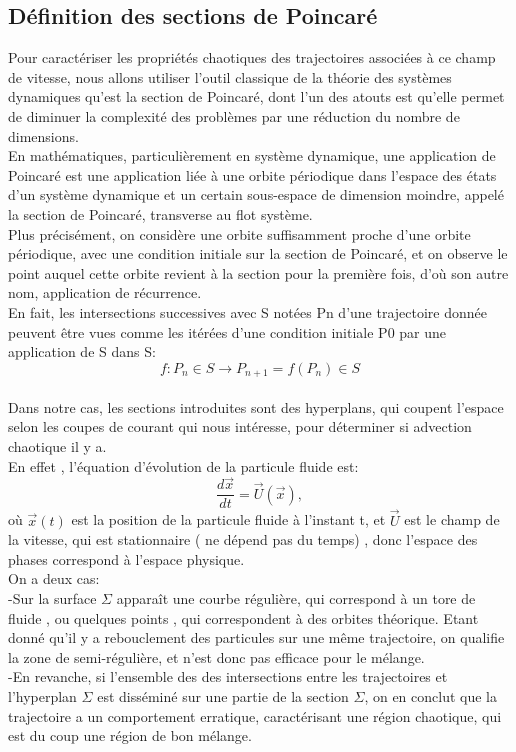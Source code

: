 \documentclass[a4paper,12pt,titlepage]{report}
\begin{document}
\subsection{Définition des sections de Poincaré}
Pour caractériser les propriétés chaotiques des trajectoires associées à ce champ de vitesse, nous allons utiliser l'outil classique de la théorie des systèmes dynamiques qu'est la section de Poincaré, dont l'un des atouts est qu'elle permet de diminuer la complexité des problèmes par une réduction du nombre de dimensions. 
\\
En mathématiques, particulièrement en système dynamique, une application de Poincaré est une application liée à une orbite périodique dans l’espace des états d’un système dynamique et un certain sous-espace de dimension moindre, appelé la section de Poincaré, transverse au  flot système.\\
 Plus précisément, on considère une orbite suffisamment proche d'une orbite périodique, avec une condition initiale sur la section de Poincaré, et on observe le point auquel cette orbite revient à la section pour la première fois, d'où son autre nom, application de récurrence.
\\
En fait, les intersections successives avec S notées Pn d’une trajectoire donnée peuvent être vues comme les itérées d’une condition initiale P0 par une application de S dans S:
\\
\[f: P_n \in S \to P_{n+1} = f(P_n) \in S \]
\\
Dans notre cas, les sections introduites sont des hyperplans, qui coupent l'espace selon les coupes de courant qui nous intéresse, pour déterminer si advection chaotique il y a.
\\
En effet , l'équation d'évolution de la particule fluide est:
\\
\[ \frac{d\vec{x}}{dt} = \vec{U}(\vec{x}), \]
où $\vec{x}(t)$ est la position de la particule fluide à l'instant t, et $\vec{U}$ est le champ de la vitesse, qui est stationnaire ( ne dépend pas du temps) , donc l'espace des phases correspond à l'espace physique. 
\\
On a deux cas:
\\
-Sur la surface $\Sigma $ apparaît une courbe régulière, qui correspond à un tore de fluide , ou quelques points , qui correspondent à des orbites théorique. Etant donné qu'il y a rebouclement des particules sur une même trajectoire, on qualifie la zone de semi-régulière, et n'est donc pas efficace pour le mélange. 
\\

-En revanche, si l'ensemble des des intersections entre les trajectoires et l'hyperplan $\Sigma$ est disséminé sur une partie de la section $\Sigma$, on en conclut que la trajectoire a un comportement erratique, caractérisant une région chaotique, qui est du coup une région de bon mélange. 
\end{document}
